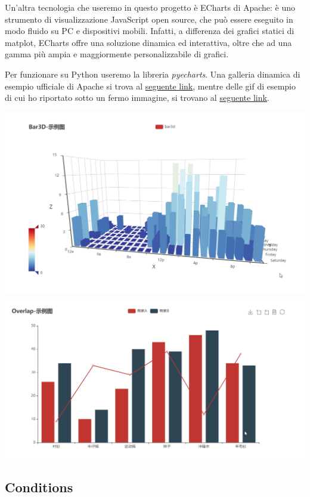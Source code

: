 \documentclass[11pt, oneside]{article}
\begin{document}
Un'altra tecnologia che useremo in questo progetto è ECharts di Apache: è uno strumento di visualizzazione JavaScript open source, che può essere eseguito in modo fluido su PC e dispositivi mobili. Infatti, a differenza dei grafici statici di matplot, ECharts offre una soluzione dinamica ed interattiva, oltre che ad una gamma più ampia e maggiormente personalizzabile di grafici.


Per funzionare su Python useremo la libreria \emph{pyecharts}. Una galleria dinamica di esempio ufficiale di Apache si trova al \href{https://echarts.apache.org/examples/en/index.html}{seguente link}, mentre delle gif di esempio di cui ho riportato sotto un fermo immagine, si trovano al \href{https://github.com/pyecharts/pyecharts#-demo}{seguente link}.

\begin{center}
\includegraphics[scale=0.3]{1_echarts_1.png}
\includegraphics[scale=0.3]{1_echarts_2.png}
\end{center}

\subsection{Conditions}
\end{document}
